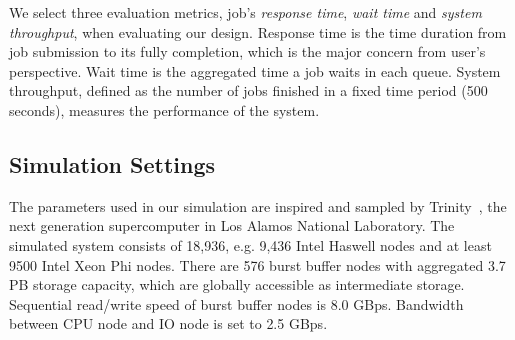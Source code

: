 We select three evaluation metrics, job's \textit{response time}, \textit{wait time} and 
\textit{system throughput}, when evaluating our design.
Response time is the time duration from job submission to its fully completion,
which is the major concern from user's perspective.
Wait time is the aggregated time a job waits in each queue.
System throughput, defined as the number of jobs finished in
a fixed time period (500 seconds), measures the performance of the system.


\subsection{Simulation Settings}

The parameters used in our simulation are inspired and sampled by Trinity~\cite{TrinitySystem}, 
the next generation supercomputer in Los Alamos National Laboratory.
The simulated system consists of 18,936,
e.g. 9,436 Intel Haswell nodes
and at least 9500 Intel Xeon Phi nodes.
There are 576 burst buffer nodes with aggregated 3.7 PB storage capacity, 
which are globally accessible as intermediate storage.
Sequential read/write speed of burst buffer nodes is 8.0 GBps.
Bandwidth between CPU node and IO node is set to 2.5 GBps.



